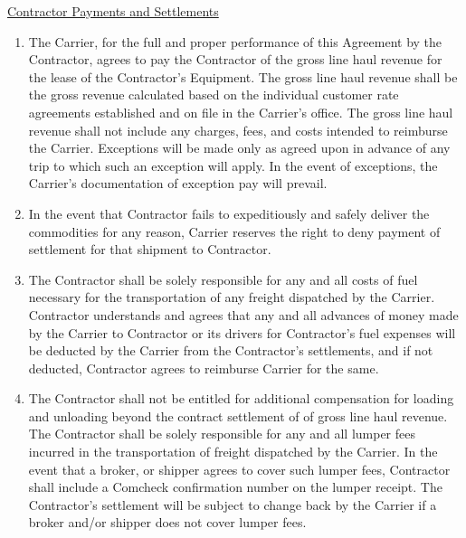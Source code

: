 \underline{Contractor Payments and Settlements}
\begin{enumerate}[ 
    ref = \SecondLevelEnumerator
]
    \item The Carrier, for the full and proper performance of this
    Agreement by the Contractor, agrees to pay the Contractor
    {\bfseries \GrossRevenueCommision} of the gross line haul revenue for
    the lease of the Contractor's Equipment. The gross line haul revenue
    shall be the gross revenue calculated based on the individual customer
    rate agreements established and on file in the Carrier's office. The
    gross line haul revenue shall not include any charges, fees, and costs
    intended to reimburse the Carrier. Exceptions will be made only as
    agreed upon in advance of any trip to which such an exception will
    apply. In the event of exceptions, the Carrier's documentation of
    exception pay will prevail.

    \item In the event that Contractor fails to expeditiously and safely
    deliver the commodities for any reason, Carrier reserves the right to
    deny payment of settlement for that shipment to Contractor.

    \item The Contractor shall be solely responsible for any and all costs
    of fuel necessary for the transportation of any freight dispatched by
    the Carrier. Contractor understands and agrees that any and all
    advances of money made by the Carrier to Contractor or its drivers for
    Contractor's fuel expenses will be deducted by the Carrier from the
    Contractor's settlements, and if not deducted, Contractor agrees to
    reimburse Carrier for the same.

    \item The Contractor shall not be entitled for additional compensation
    for loading and unloading beyond the contract settlement of
    {\bfseries \GrossRevenueCommision} of gross line haul revenue. The
    Contractor shall be solely responsible for any and all lumper fees
    incurred in the transportation of freight dispatched by the Carrier. In
    the event that a broker, or shipper agrees to cover such lumper fees,
    Contractor shall include a Comcheck confirmation number on the lumper
    receipt. The Contractor's settlement will be subject to change back by
    the Carrier if a broker and/or shipper does not cover lumper fees.


\end{enumerate}
